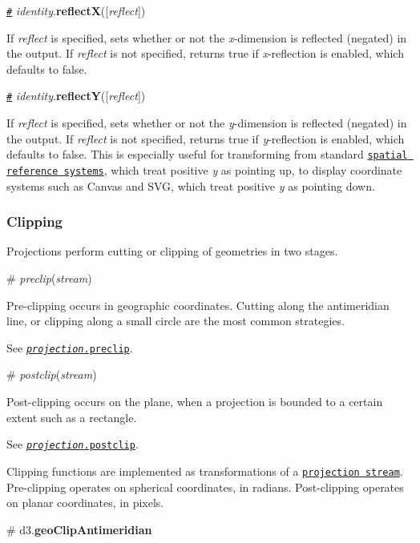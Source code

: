 \href{#identity_reflectX}{\tt \#} {\itshape identity}.{\bfseries reflectX}(\mbox{[}{\itshape reflect}\mbox{]})

If {\itshape reflect} is specified, sets whether or not the {\itshape x}-\/dimension is reflected (negated) in the output. If {\itshape reflect} is not specified, returns true if {\itshape x}-\/reflection is enabled, which defaults to false.

\href{#identity_reflectY}{\tt \#} {\itshape identity}.{\bfseries reflectY}(\mbox{[}{\itshape reflect}\mbox{]})

If {\itshape reflect} is specified, sets whether or not the {\itshape y}-\/dimension is reflected (negated) in the output. If {\itshape reflect} is not specified, returns true if {\itshape y}-\/reflection is enabled, which defaults to false. This is especially useful for transforming from standard \href{https://en.wikipedia.org/wiki/Spatial_reference_system}{\tt spatial reference systems}, which treat positive {\itshape y} as pointing up, to display coordinate systems such as Canvas and S\+VG, which treat positive {\itshape y} as pointing down.

\subsubsection*{Clipping}

Projections perform cutting or clipping of geometries in two stages.

\label{_preclip}%
\# {\itshape preclip}({\itshape stream})

Pre-\/clipping occurs in geographic coordinates. Cutting along the antimeridian line, or clipping along a small circle are the most common strategies.

See \href{#projection_preclip}{\tt {\itshape projection}.preclip}.

\label{_postclip}%
\# {\itshape postclip}({\itshape stream})

Post-\/clipping occurs on the plane, when a projection is bounded to a certain extent such as a rectangle.

See \href{#projection_postclip}{\tt {\itshape projection}.postclip}.

Clipping functions are implemented as transformations of a \href{#streams}{\tt projection stream}. Pre-\/clipping operates on spherical coordinates, in radians. Post-\/clipping operates on planar coordinates, in pixels.

\label{_geoClipAntimeridian}%
\# d3.{\bfseries geo\+Clip\+Antimeridian}

